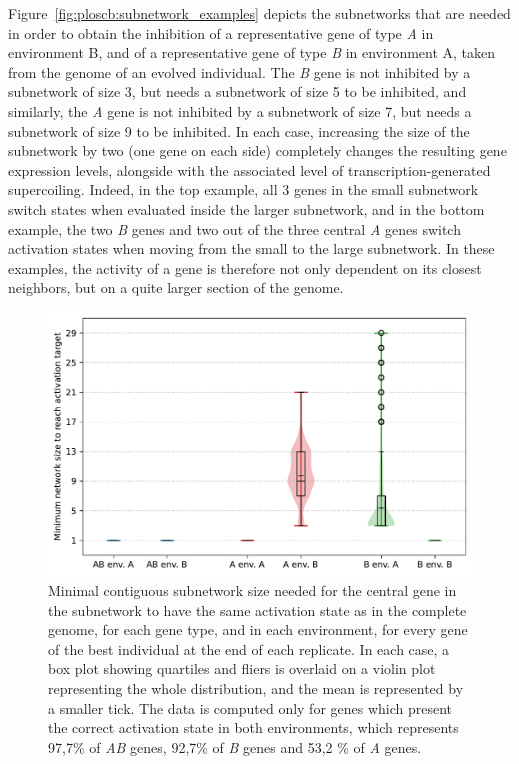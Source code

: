 Figure~\ref{fig:ploscb:subnetwork_examples} depicts the subnetworks that are needed in order to obtain the inhibition of a representative gene of type \emph{A} in environment B, and of a representative gene of type \emph{B} in environment A, taken from the genome of an evolved individual.
The \emph{B} gene is not inhibited by a subnetwork of size 3, but needs a subnetwork of size 5 to be inhibited, and similarly, the \emph{A} gene is not inhibited by a subnetwork of size 7, but needs a subnetwork of size 9 to be inhibited.
In each case, increasing the size of the subnetwork by two (one gene on each side) completely changes the resulting gene expression levels, alongside with the associated level of transcription-generated supercoiling.
Indeed, in the top example, all 3 genes in the small subnetwork switch states when evaluated inside the larger subnetwork, and in the bottom example, the two \emph{B} genes and two out of the three central \emph{A} genes switch activation states when moving from the small to the large subnetwork.
In these examples, the activity of a gene is therefore not only dependent on its closest neighbors, but on a quite larger section of the genome.

\begin{figure}[H]
  \centering
  \includegraphics[width=\textwidth]{ploscb/img/min_network_size.pdf}
  \caption[Minimal subnetwork size needed to obtain the correct activation state per gene type]{Minimal contiguous subnetwork size needed for the central gene in the subnetwork to have the same activation state as in the complete genome, for each gene type, and in each environment, for every gene of the best individual at the end of each replicate.
  In each case, a box plot showing quartiles and fliers is overlaid on a violin plot representing the whole distribution, and the mean is represented by a smaller tick.
  The data is computed only for genes which present the correct activation state in both environments, which represents 97,7\% of \emph{AB} genes, 92,7\% of \emph{B} genes and 53,2 \% of \emph{A} genes.}
  \label{fig:ploscb:min_subnetwork}
\end{figure}

